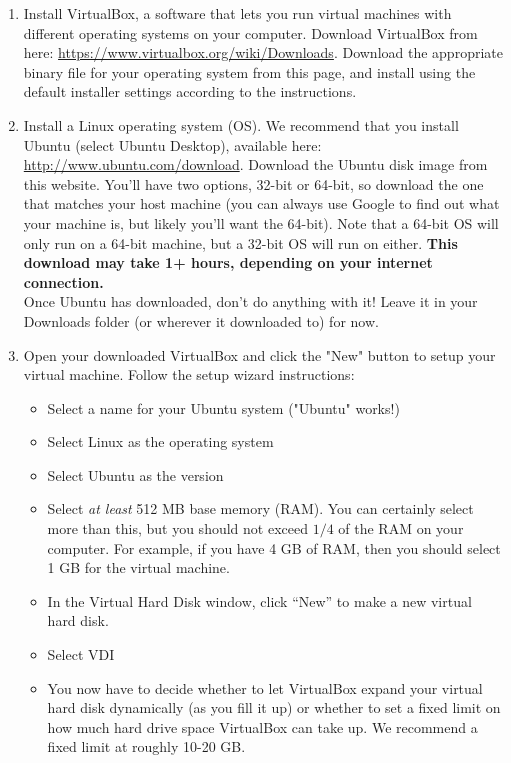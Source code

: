 \documentclass{article}
\begin{document}
\begin{enumerate}
	\item Install VirtualBox, a software that lets you run virtual machines with different operating systems on your computer. Download VirtualBox from here: \href{https://www.virtualbox.org/wiki/Downloads}{https://www.virtualbox.org/wiki/Downloads}. Download the appropriate binary file for your operating system from this page, and install using the default installer settings according to the instructions.
	
	\item Install a Linux operating system (OS). We recommend that you install Ubuntu (select Ubuntu Desktop), available here: \\ \href{http://www.ubuntu.com/download}{http://www.ubuntu.com/download}. Download the Ubuntu disk image from this website. You'll have two options, 32-bit or 64-bit, so download the one that matches your host machine (you can always use Google to find out what your machine is, but likely you'll want the 64-bit). Note that a 64-bit OS will only run on a 64-bit machine, but a 32-bit OS will run on either. \textbf{This download may take 1+ hours, depending on your internet connection.}
	\\ Once Ubuntu has downloaded, don't do anything with it! Leave it in your Downloads folder (or wherever it downloaded to) for now.
	
	\item Open your downloaded VirtualBox and click the "New" button to setup your virtual machine. Follow the setup wizard instructions:
	\begin{itemize}
		\item Select a name for your Ubuntu system ("Ubuntu" works!)
		\item Select Linux as the operating system
		\item Select Ubuntu as the version
		\item Select \emph{at least} 512 MB base memory (RAM). You can certainly select more than this, but you should not exceed $1/4$ of the RAM on your computer. For example, if you have 4 GB of RAM, then you should select 1 GB for the virtual machine.
		\item In the Virtual Hard Disk window, click “New” to make a new virtual hard disk.
		\item Select VDI
		\item You now have to decide whether to let VirtualBox expand your virtual hard disk dynamically (as you fill it up) or whether to set a fixed limit on how much hard drive space VirtualBox can take up. We recommend a fixed limit at roughly 10-20 GB.
	\end{itemize}
	

\end{enumerate}
\end{document}
